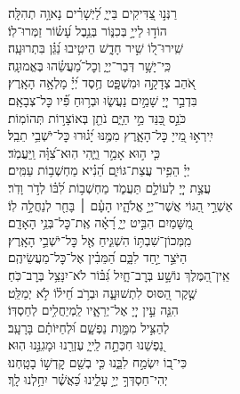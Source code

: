 \documentclass[twoside, openany, parskip=half, 11pt]{book}
\begin{document}
\begin{narrow}
רַנְּנ֣וּ צַ֭דִּיקִים בַּייָ֑ \hfill
 לַ֝יְשָׁרִ֗ים נָאוָ֥ה תְהִלָּֽה׃ \\
 הוֹד֣וּ לַייָ֣ בְּכִנּ֑וֹר \hfill בְּנֵ֥בֶל עָ֝שׂ֗וֹר זַמְּרוּ־לֽוֹ׃ \\
 שִֽׁירוּ־ל֭וֹ שִׁ֣יר חָדָ֑שׁ \hfill הֵיטִ֥יבוּ נַ֝גֵּ֗ן בִּתְרוּעָֽה׃ \\
 כִּֽי־יָשָׁ֥ר דְּבַר־יְיָ֑ \hfill וְכׇל־מַ֝עֲשֵׂ֗הוּ בֶּאֱמוּנָֽה׃ \\
 אֹ֭הֵב צְדָקָ֣ה וּמִשְׁפָּ֑ט \hfill חֶ֥סֶד יְ֝יָ֗ מָלְאָ֥ה הָאָֽרֶץ׃ \\
 בִּדְבַ֣ר יְיָ֭ שָׁמַ֣יִם נַעֲשׂ֑וּ \hfill וּבְר֥וּחַ פִּ֗֝יו כׇּל־צְבָאָֽם׃ \\
 כֹּנֵ֣ס כַּ֭נֵּד מֵ֣י הַיָּ֑ם \hfill נֹתֵ֖ן בְּאוֹצָר֣וֹת תְּהוֹמֽוֹת׃ \\
 יִֽירְא֣וּ מֵ֭ייָ כׇּל־הָאָ֑רֶץ \hfill מִמֶּ֥נּוּ יָ֝ג֗וּרוּ כׇּל־יֹשְׁבֵ֥י תֵבֵֽל׃ \\
 כִּ֤י ה֣וּא אָמַ֣ר וַיֶּ֑הִי \hfill הֽוּא־צִ֝וָּ֗ה וַֽיַּעֲמֹֽד׃ \\
 יְיָ֗ הֵפִ֥יר עֲצַת־גּוֹיִ֑ם \hfill הֵ֝נִ֗יא מַחְשְׁב֥וֹת עַמִּֽים׃ \\
 עֲצַ֣ת יְיָ֭ לְעוֹלָ֣ם תַּעֲמֹ֑ד \hfill מַחְשְׁב֥וֹת לִ֝בּ֗וֹ לְדֹ֣ר וָדֹֽר׃ \\
 אַשְׁרֵ֣י הַ֭גּוֹי אֲשֶׁר־יְיָ֣ אֱלֹהָ֑יו \hfill הָעָ֓ם ׀ בָּחַ֖ר לְנַחֲלָ֣ה לֽוֹ׃ \\
 מִ֭שָּׁמַיִם הִבִּ֣יט יְיָ֑ \hfill רָ֝אָ֗ה אֶֽת־כׇּל־בְּנֵ֥י הָאָדָֽם׃ \\
 מִֽמְּכוֹן־שִׁבְתּ֥וֹ הִשְׁגִּ֑יחַ \hfill אֶ֖ל כׇּל־יֹשְׁבֵ֣י הָאָֽרֶץ׃ \\
 הַיֹּצֵ֣ר יַ֣חַד לִבָּ֑ם \hfill הַ֝מֵּבִ֗ין אֶל־כׇּל־מַעֲשֵׂיהֶֽם׃ \\
 אֵֽין־הַ֭מֶּלֶךְ נוֹשָׁ֣ע בְּרׇב־חָ֑יִל \hfill גִּ֝בּ֗וֹר לֹא־יִנָּצֵ֥ל בְּרׇב־כֹּֽחַ׃ \\
 שֶׁ֣קֶר הַ֭סּוּס לִתְשׁוּעָ֑ה \hfill וּבְרֹ֥ב חֵ֝יל֗וֹ לֹ֣א יְמַלֵּֽט׃ \\
 הִנֵּ֤ה עֵ֣ין יְיָ֭ אֶל־יְרֵאָ֑יו \hfill לַֽמְיַחֲלִ֥ים לְחַסְדּֽוֹ׃ \\
 לְהַצִּ֣יל מִמָּ֣וֶת נַפְשָׁ֑ם \hfill וּ֝לְחַיּוֹתָ֗ם בָּרָעָֽב׃ \\
 נַ֭פְשֵׁנוּ חִכְּתָ֣ה לַֽייָ֑ \hfill עֶזְרֵ֖נוּ וּמָגִנֵּ֣נוּ הֽוּא׃ \\
 כִּי־ב֭וֹ יִשְׂמַ֣ח לִבֵּ֑נוּ \hfill כִּ֤י בְשֵׁ֖ם קׇדְשׁ֣וֹ בָטָֽחְנוּ׃ \\
 יְהִי־חַסְדְּךָ֣ יְיָ֣ עָלֵ֑ינוּ \hfill כַּ֝אֲשֶׁ֗ר יִחַ֥לְנוּ לָֽךְ׃ \\


\end{narrow}
\end{document}
